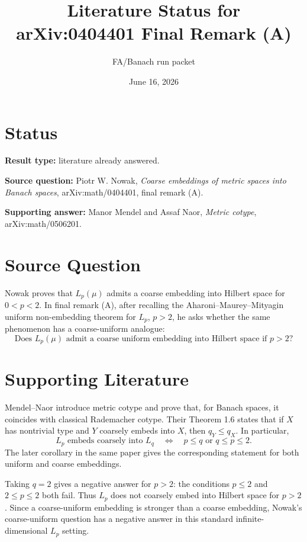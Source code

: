 \documentclass[11pt]{article}
\title{Literature Status for arXiv:0404401 Final Remark (A)}
\author{FA/Banach run packet}
\date{June 16, 2026}
\begin{document}
\maketitle

\section*{Status}

\textbf{Result type:} literature already answered.

\textbf{Source question:} Piotr W. Nowak, \emph{Coarse embeddings of metric
spaces into Banach spaces}, arXiv:math/0404401, final remark (A).

\textbf{Supporting answer:} Manor Mendel and Assaf Naor, \emph{Metric cotype},
arXiv:math/0506201.

\section*{Source Question}

Nowak proves that \(L_p(\mu)\) admits a coarse embedding into Hilbert space for
\(0<p<2\). In final remark (A), after recalling the Aharoni--Maurey--Mityagin
uniform non-embedding theorem for \(L_p\), \(p>2\), he asks whether the same
phenomenon has a coarse-uniform analogue:
\[
\text{Does } L_p(\mu) \text{ admit a coarse uniform embedding into Hilbert
space if } p>2?
\]

\section*{Supporting Literature}

Mendel--Naor introduce metric cotype and prove that, for Banach spaces, it
coincides with classical Rademacher cotype. Their Theorem 1.6 states that if
\(X\) has nontrivial type and \(Y\) coarsely embeds into \(X\), then
\(q_Y\le q_X\). In particular,
\[
L_p \text{ embeds coarsely into } L_q
\quad\Longleftrightarrow\quad
p\le q \text{ or } q\le p\le 2 .
\]
The later corollary in the same paper gives the corresponding statement for
both uniform and coarse embeddings.

Taking \(q=2\) gives a negative answer for \(p>2\): the conditions
\(p\le 2\) and \(2\le p\le 2\) both fail. Thus \(L_p\) does not coarsely embed
into Hilbert space for \(p>2\). Since a coarse-uniform embedding is stronger
than a coarse embedding, Nowak's coarse-uniform question has a negative answer
in this standard infinite-dimensional \(L_p\) setting.
\end{document}
